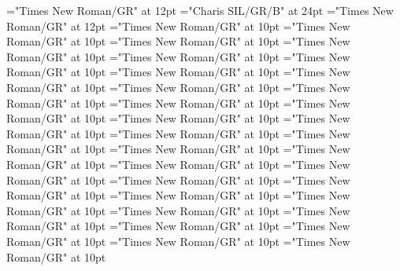 \documentclass[a4paper]{article}
\begin{document}
\pagestyle{plain}
\sloppy
\setlength{\parfillskip}{0pt plus 1fil}
\font{}="Times New Roman/GR" at 12pt
\font{}="Charis SIL/GR/B" at 24pt
\font{}="Times New Roman/GR" at 12pt
\font\entryletDatadicBody="Times New Roman/GR" at 10pt
\font\pictureRightentryletDatadicBody="Times New Roman/GR" at 10pt
\font\picturepictureRightentryletDatadicBody="Times New Roman/GR" at 10pt
\font\pictureCaptionpictureRightentryletDatadicBody="Times New Roman/GR" at 10pt
\font\CmPicturepublishStemPileThumbnailPubpictureCaptionpictureRightentryletDatadicBody="Times New Roman/GR" at 10pt
\font\pictureLabelenpictureCaptionpictureRightentryletDatadicBody="Times New Roman/GR" at 10pt
\font\spanenpictureLabelenpictureCaptionpictureRightentryletDatadicBody="Times New Roman/GR" at 10pt
\font\headwordggoTeluxINentryletDatadicBody="Times New Roman/GR" at 10pt
\font\pronunciationsentryletDatadicBody="Times New Roman/GR" at 10pt
\font\pronunciationggofonipaxemicpronunciationsentryletDatadicBody="Times New Roman/GR" at 10pt
\font\spanggofonipaxemicpronunciationggofonipaxemicpronunciationsentryletDatadicBody="Times New Roman/GR" at 10pt
\font\sensesentryletDatadicBody="Times New Roman/GR" at 10pt
\font\sensesensesentryletDatadicBody="Times New Roman/GR" at 10pt
\font\grammaticalinfosensesensesentryletDatadicBody="Times New Roman/GR" at 10pt
\font\partofspeechengrammaticalinfosensesensesentryletDatadicBody="Times New Roman/GR" at 10pt
\font\spanenpartofspeechengrammaticalinfosensesensesentryletDatadicBody="Times New Roman/GR" at 10pt
\font\xsensenumbersensesentryletDatadicBody="Times New Roman/GR" at 10pt
\font{}="Times New Roman/GR" at 10pt
\font\spanendefinitionensensesensesentryletDatadicBody="Times New Roman/GR" at 10pt
\font\LexSensepublishStemGlossPubensensesensesentryletDatadicBody="Times New Roman/GR" at 10pt
\font\spanenLexSensepublishStemGlossPubensensesensesentryletDatadicBody="Times New Roman/GR" at 10pt
\font\examplessensesensesentryletDatadicBody="Times New Roman/GR" at 10pt
\font\exampleggoTeluxINexamplessensesensesentryletDatadicBody="Times New Roman/GR" at 10pt
\font\spanggoTeluxINexampleggoTeluxINexamplessensesensesentryletDatadicBody="Times New Roman/GR" at 10pt
\font\translationsexamplessensesensesentryletDatadicBody="Times New Roman/GR" at 10pt
\font\translationentranslationsexamplessensesensesentryletDatadicBody="Times New Roman/GR" at 10pt
\font\xitementranslationentranslationsexamplessensesensesentryletDatadicBody="Times New Roman/GR" at 10pt
\font\spanenxitementranslationentranslationsexamplessensesensesentryletDatadicBody="Times New Roman/GR" at 10pt
\font\xitemtetranslationentranslationsexamplessensesensesentryletDatadicBody="Times New Roman/GR" at 10pt
\font\spantexitemtetranslationentranslationsexamplessensesensesentryletDatadicBody="Times New Roman/GR" at 10pt
\end{document}
